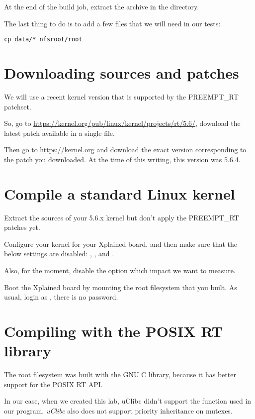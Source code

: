 At the end of the build job, extract the
 archive in the 
directory.

The last thing to do is to add a few files that we will need in our
tests:

\begin{verbatim}
cp data/* nfsroot/root
\end{verbatim}

\section{Downloading sources and patches}

We will use a recent kernel version that is supported by the PREEMPT\_RT
patchset.

So, go to
\url{https://kernel.org/pub/linux/kernel/projects/rt/5.6/},
download the latest patch available in a single file.

Then go to \url{https://kernel.org} and download the exact version
corresponding to the patch you downloaded. At the time of this writing,
this version was 5.6.4.

\section{Compile a standard Linux kernel}

Extract the sources of your 5.6.x kernel but don't apply the
PREEMPT\_RT patches yet.

Configure your kernel for your Xplained board, and then make sure
that the below settings are disabled:
, ,
 and .

Also, for the moment, disable the 
option which impact we want to measure.

Boot the Xplained board by mounting the root filesystem that you
built. As usual, login as , there is no password.

\section{Compiling with the POSIX RT library}

The root filesystem was built with the GNU C library, because it has
better support for the POSIX RT API.

In our case, when we created this lab, uClibc didn't support the
 function used in our 
program. {\em uClibc} also does not support priority inheritance on
mutexes.

